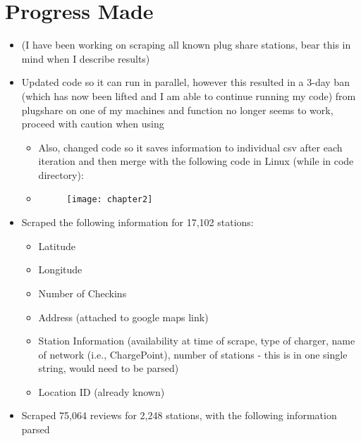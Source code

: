\documentclass[12pt]{article}
\begin{document}
 
%

\rhead{\today}
 
\section{Progress Made}
\begin{itemize}
\item (I have been working on scraping all known plug share stations, bear this in mind when I describe results)
\item Updated code so it can run in parallel, however this resulted in a 3-day ban (which has now been lifted and I am able to continue running my code) from plugshare on one of my machines and function no longer seems to work, proceed with caution when using
\begin{itemize}
\item Also, changed code so it saves information to individual csv after each iteration and then merge with the following code in Linux (while in code directory):
\item 
\begin{figure}[htb]
\begin{center}
\texttt{[image: chapter2]}
\end{center}
\end{figure}
\end{itemize}
\item Scraped the following information for 17,102 stations:
\begin{itemize}
\item Latitude
\item Longitude
\item Number of Checkins
\item Address (attached to google maps link)
\item Station Information (availability at time of scrape, type of charger, name of network (i.e., ChargePoint), number of stations - this is in one single string, would need to be parsed)
\item Location ID (already known)
\end{itemize}
\item Scraped 75,064 reviews for 2,248 stations, with the following information parsed

\end{itemize}
\end{document}
